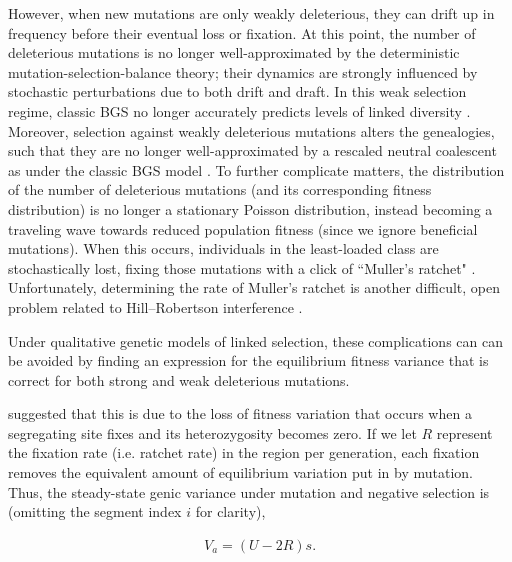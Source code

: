 \documentclass[11pt]{article}
\begin{document}
However, when new mutations are only weakly deleterious, they can drift up in
frequency before their eventual loss or fixation. At this point, the number of
deleterious mutations is no longer well-approximated by the deterministic
mutation-selection-balance theory; their dynamics are strongly influenced by
stochastic perturbations due to both drift and draft. In this weak selection
regime, classic BGS no longer accurately predicts levels of linked diversity
\parencite{Charlesworth1993-gb,McVean2000-bt,Good2013-lp,Gordo2002-dr}.
Moreover, selection against weakly deleterious mutations alters the
genealogies, such that they are no longer well-approximated by a rescaled
neutral coalescent as under the classic BGS model
\parencite{Przeworski1999-mb,OFallon2010-my,Higgs1995-xc}. To further
complicate matters, the distribution of the number of deleterious mutations
(and its corresponding fitness distribution) is no longer a stationary Poisson
distribution, instead becoming a traveling wave
\parencite{Rouzine2008-qz,Good2013-lp,Gessler1995-hz} towards reduced
population fitness (since we ignore beneficial mutations). When this occurs,
individuals in the least-loaded class are stochastically lost, fixing those
mutations with a click of ``Muller's ratchet"
\parencite{Muller1964-ki,Charlesworth1997-qn}. Unfortunately, determining the
rate of Muller's ratchet is another difficult, open problem
\parencite{Haigh1978-gt,Gordo2002-dr,Gessler1995-hz,Higgs1995-xc} related to
Hill--Robertson interference \parencite{Felsenstein1974-xm}.

Under qualitative genetic models of linked selection, these complications can
can be avoided by finding an expression for the equilibrium fitness variance
that is correct for both strong and weak deleterious mutations.

\textcite{Santiago2016-mu} suggested that this is due to the loss of fitness
variation that occurs when a segregating site fixes and its heterozygosity
becomes zero. If we let $R$ represent the fixation rate (i.e. ratchet rate) in
the region per generation, each fixation removes the equivalent amount of
equilibrium variation put in by mutation. Thus, the steady-state genic variance
under mutation and negative selection is (omitting the segment index $i$ for
clarity),

\begin{align}
  \label{eq:Va}
  V_{a} = (U - 2 R)s. 
\end{align}
\end{document}
